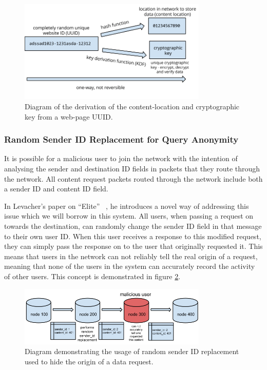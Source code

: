 \begin{figure}[H]
    \centering
    \includegraphics[width=0.8\textwidth]{img/KDF-hashing-example.png}
    \caption{Diagram of the derivation of the content-location and cryptographic key from a web-page UUID.}
    \label{fig:kdf_hashing}
\end{figure}


\subsubsection{Random Sender ID Replacement for Query Anonymity}

It is possible for a malicious user to join the network with the intention of analysing the
sender and destination ID fields in packets that they route through the network. All content request
packets routed through the network include both a sender ID and content ID field.

In Levacher's paper on ``Elite'' ~\cite{levacher}, he introduces a novel way of addressing this issue which we will borrow
in this system.
All users, when passing a request on towards the destination, can randomly change the sender ID field in that message
to their own user ID. When this user receives a response to this modified request, they can simply pass the response
on to the user that originally requested it. This means that users in the network can not reliably tell
the real origin of a request, meaning that none of the users in the system can accurately record the activity of other users.
This concept is demonstrated in figure \ref{fig:sender_id}.

\begin{figure}[H]
    \centering
    \includegraphics[width=0.8\textwidth]{img/sender_id.png}
    \caption{Diagram demonstrating the usage of random sender ID replacement used to hide the origin of a data request.}
    \label{fig:sender_id}
\end{figure}


